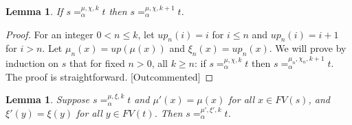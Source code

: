 \documentclass{lmcs}
\theoremstyle{theorem}\newtheorem{theorem}[dummy]{Theorem}
\theoremstyle{theorem}\newtheorem{lemma}[dummy]{Lemma}
\theoremstyle{theorem}\newtheorem{corollary}[dummy]{Corollary}
\theoremstyle{definition}\newtheorem{definition}[dummy]{Definition}
\theoremstyle{definition}\newtheorem{example}[dummy]{Example}
\newcommand{\FV}{\mathit{FV}}
\newcommand{\identifier}[1]{\mathtt{#1}}
\newcommand{\afun}{\identifier{f}}
\newcommand{\abs}[2]{\lambda #1.#2}
\begin{document}
\begin{lemma}\label{lem:alphaincrease}
If $s =_\alpha^{\mu,\chi,k} t$ then $s =_\alpha^{\mu,\chi,k+1} t$.
\end{lemma}

\begin{proof}
For an integer $0 < n \leq k$, let $\mathit{up}_n(i) = i$ for $i \leq n$ and $\mathit{up}_n(i) = i+1$ for $i > n$.
Let $\mu_n(x) = \mathit{up}(\mu(x))$ and $\xi_n(x) = \mathit{up}_n(x)$.
We will prove by induction on $s$ that for fixed $n > 0$, all $k \geq n$: if $s =_\alpha^{\mu,\chi,k} t$ then $s =_\alpha^{\mu_n,\chi_n,k+1} t$.
The proof is straightforward. [Outcommented]
\end{proof}

\begin{lemma}\label{lem:alphaunusedvar}
Suppose $s =_\alpha^{\mu,\xi,k} t$ and $\mu'(x) = \mu(x)$ for all $x \in \FV(s)$, and $\xi'(y) = \xi(y)$ for all $y \in \FV(t)$.
Then $s =_\alpha^{\mu',\xi',k} t$.
\end{lemma}
\end{document}
